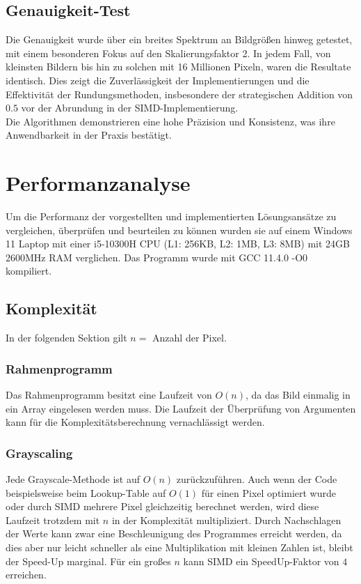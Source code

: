 \documentclass[course=erap]{aspdoc}
\begin{document}
\subsection{Genauigkeit-Test}
Die Genauigkeit wurde über ein breites Spektrum an Bildgrößen hinweg getestet, mit einem besonderen Fokus auf den Skalierungsfaktor 2. In jedem Fall, von kleinsten Bildern bis hin zu solchen mit 16 Millionen Pixeln, waren die Resultate identisch. Dies zeigt die Zuverlässigkeit der Implementierungen und die Effektivität der Rundungsmethoden, insbesondere der strategischen Addition von $0.5$ vor der Abrundung in der SIMD-Implementierung.\\
Die Algorithmen demonstrieren eine hohe Präzision und Konsistenz, was ihre Anwendbarkeit in der Praxis bestätigt.


\section{Performanzanalyse}
Um die Performanz der vorgestellten und implementierten Lösungsansätze zu vergleichen, überprüfen und beurteilen zu können wurden sie auf einem Windows 11 Laptop mit einer i5-10300H CPU (L1: 256KB, L2: 1MB, L3: 8MB) mit 24GB 2600MHz RAM verglichen. Das Programm wurde mit GCC 11.4.0 -O0 kompiliert.

\subsection{Komplexität}
In der folgenden Sektion gilt $n =$ Anzahl der Pixel.

\subsubsection{Rahmenprogramm}
Das Rahmenprogramm besitzt eine Laufzeit von $O(n)$, da das Bild einmalig in ein Array eingelesen werden muss. Die Laufzeit der Überprüfung von Argumenten kann für die Komplexitätsberechnung vernachlässigt werden.

\subsubsection{Grayscaling}
Jede Grayscale-Methode ist auf $O(n)$ zurückzuführen. Auch wenn der Code beispielsweise beim Lookup-Table auf $O(1)$ für einen Pixel optimiert wurde oder durch SIMD mehrere Pixel gleichzeitig berechnet werden, wird diese Laufzeit trotzdem mit $n$ in der Komplexität multipliziert. Durch Nachschlagen der Werte kann zwar eine Beschleunigung des Programmes erreicht werden, da dies aber nur leicht schneller als eine Multiplikation mit kleinen Zahlen ist, bleibt der Speed-Up marginal. Für ein großes $n$ kann SIMD ein SpeedUp-Faktor von $4$ erreichen.
\end{document}
